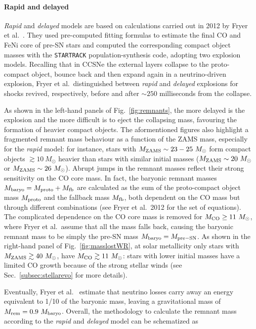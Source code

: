\documentclass[a4paper,titlepage]{book}     	%
\newcommand{\sun}{\ensuremath{_\odot}}
\newcommand{\mzams}{M_\textup{ZAMS}}
\newcommand{\msun}{\ensuremath{M\sun}}
\begin{document}
\paragraph{Rapid and delayed} \emph{Rapid} and \emph{delayed} models are based on calculations carried out in 2012 by Fryer et al.\ \cite{Fryer2012}. They used pre-computed fitting formulas to estimate the final CO and FeNi core of pre-SN stars and computed the corresponding compact object masses with the \texttt{STARTRACK} \cite{Belczynski2010_WRwindsSTARTRACK} population-synthesis code, adopting two explosion models. Recalling that in CCSNe the external layers collapse to the proto-compact object, bounce back and then expand again in a neutrino-driven explosion, Fryer et al.\ distinguished between \emph{rapid} and \emph{delayed} explosions for shocks revived, respectively, before and after $\sim 250$ milliseconds from the collapse. 


As shown in the left-hand panels of Fig.\ \ref{fig:remnants}, the more delayed is the explosion and the more difficult is to eject the collapsing mass, favouring the formation of heavier compact objects. The aformentioned figures also highlight a fragmented remnant mass behaviour as a function of the ZAMS mass, especially for the \emph{rapid} model: for instance, stars with $\mzams \sim 23-25~\msun$ form compact objects $\gtrsim 10~\msun$ heavier than stars with similar initial masses ($\mzams \sim 20~\msun$ or $\mzams \sim 26~\msun$). Abrupt jumps in the remnant masses reflect their strong sensitivity on the CO core mass. In fact, the baryonic remnant masses $M_{\rm baryo}=M_{\rm proto} + M_{\rm fb} $ are calculated as the sum of the proto-compact object mass $M_{\rm proto}$ and the fallback mass $M_{\rm fb}$, both dependent on the CO mass but through different combinations (see Fryer et al.\ 2012 \cite{Fryer2012} for the set of equations). The complicated dependence on the CO core mass is removed for $M_{\rm CO} \geq 11~\msun$, where Fryer et al.\ assume that all the mass falls back, causing the baryonic remnant mass to be simply the pre-SN mass $M_{\rm baryo} = M_{\rm pre-SN}$. As shown in the right-hand panel of Fig.\ \ref{fig:masslostWR}, at solar metallicity only stars with $\mzams \gtrsim 40~\msun$, have $M_{\rm CO} \gtrsim 11~\msun$: stars with lower initial masses have a limited CO growth because of the strong stellar winds (see Sec.\ \ref{subsec:stellarevo} for more details).

Eventually, Fryer et al.\ \cite{Fryer2012} estimate that neutrino losses carry away an energy equivalent to 1/10 of the baryonic mass, leaving a gravitational mass of $M_{\rm rem} = 0.9~M_{\rm baryo}$. Overall, the methodology to calculate the remnant mass according to the \emph{rapid} and \emph{delayed} model can be schematized as
\end{document}
